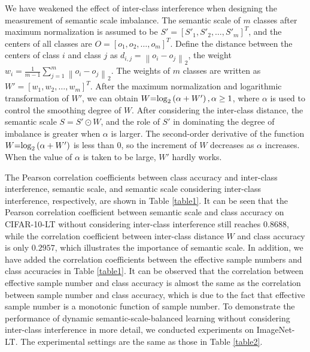 \documentclass[10pt]{article} %
\begin{document}
We have weakened the effect of inter-class interference when designing the measurement of semantic scale imbalance. The semantic scale of $m$ classes after maximum normalization is assumed to be $S' = {\left[ {{S'_1},{S'_2}, \ldots ,{S'_m}} \right]^T}$, and the centers of all classes are $O = {\left[ {{o_1},{o_2}, \ldots ,{o_m}} \right]^T}$. Define the distance between the centers of class $i$ and class $j$ as ${d_{i,j}} = {\left\| {{o_i} - {o_j}} \right\|_2}$, the weight ${w_i} = \frac{1}{{m - 1}}\sum\nolimits_{j = 1}^m {{{\left\| {{o_i} - {o_j}} \right\|}_2}} $. The weights of $m$ classes are written as $W' = {\left[ {{w_1},{w_2}, \ldots ,{w_m}} \right]^T}$. After the maximum normalization and logarithmic transformation of $W'$, we can obtain $W{\rm{ = }}{\log _2}\left( {\alpha  + W'} \right),\alpha  \ge 1$, where $\alpha$ is used to control the smoothing degree of $W$. After considering the inter-class distance, the semantic scale $S = S' \odot W$, and the role of $S'$ in dominating the degree of imbalance is greater when $\alpha$ is larger. The second-order derivative of the function $W{\rm{ = }}{\log _2}\left( {\alpha  + W'} \right)$ is less than $0$, so the increment of $W$ decreases as $\alpha$ increases. When the value of $\alpha$ is taken to be large, $W'$ hardly works.

The Pearson correlation coefficients between class accuracy and inter-class interference, semantic scale, and semantic scale considering inter-class interference, respectively, are shown in Table \ref{table1}. It can be seen that the Pearson correlation coefficient between semantic scale and class accuracy on CIFAR-10-LT without considering inter-class interference still reaches $0.8688$, while the correlation coefficient between inter-class distance $W$ and class accuracy is only $0.2957$, which illustrates the importance of semantic scale. In addition, we have added the correlation coefficients between the effective sample numbers and class accuracies in Table \ref{table1}. It can be observed that the correlation between effective sample number and class accuracy is almost the same as the correlation between sample number and class accuracy, which is due to the fact that effective sample number is a monotonic function of sample number. To demonstrate the performance of dynamic semantic-scale-balanced learning without considering inter-class interference in more detail, we conducted experiments on ImageNet-LT. The experimental settings are the same as those in Table \ref{table2}.
\end{document}
